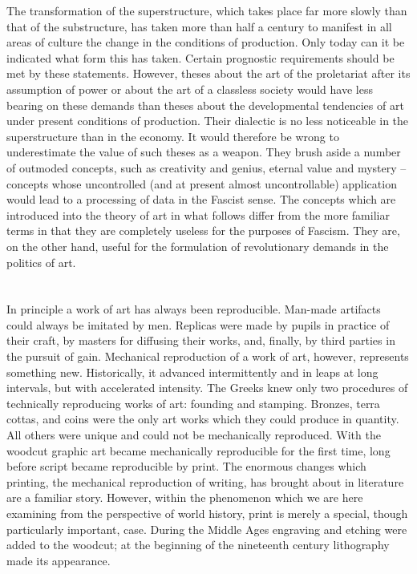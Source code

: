 \documentclass[11pt, letterpaper]{article}
\begin{document}
The transformation of the superstructure, which takes place far more slowly
than that of the substructure, has taken more than half a century to manifest
in all areas of culture the change in the conditions of production. Only today
can it be indicated what form this has taken. Certain prognostic requirements
should be met by these statements. However, theses about the art of the
proletariat after its assumption of power or about the art of a classless
society would have less bearing on these demands than theses about the
developmental tendencies of art under present conditions of production. Their
dialectic is no less noticeable in the superstructure than in the economy. It
would therefore be wrong to underestimate the value of such theses as a weapon.
They brush aside a number of outmoded concepts, such as creativity and genius,
eternal value and mystery – concepts whose uncontrolled (and at present almost
uncontrollable) application would lead to a processing of data in the Fascist
sense. The concepts which are introduced into the theory of art in what follows
differ from the more familiar terms in that they are completely useless for the
purposes of Fascism. They are, on the other hand, useful for the formulation of
revolutionary demands in the politics of art.

\section{}

In principle a work of art has always been reproducible. Man-made artifacts
could always be imitated by men. Replicas were made by pupils in practice of
their craft, by masters for diffusing their works, and, finally, by third
parties in the pursuit of gain. Mechanical reproduction of a work of art,
however, represents something new. Historically, it advanced intermittently and
in leaps at long intervals, but with accelerated intensity. The Greeks knew
only two procedures of technically reproducing works of art: founding and
stamping. Bronzes, terra cottas, and coins were the only art works which they
could produce in quantity. All others were unique and could not be mechanically
reproduced. With the woodcut graphic art became mechanically reproducible for
the first time, long before script became reproducible by print. The enormous
changes which printing, the mechanical reproduction of writing, has brought
about in literature are a familiar story. However, within the phenomenon which
we are here examining from the perspective of world history, print is merely a
special, though particularly important, case. During the Middle Ages engraving
and etching were added to the woodcut; at the beginning of the nineteenth
century lithography made its appearance.
\end{document}
